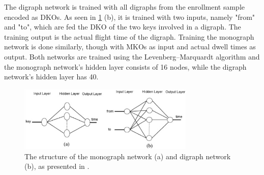 \documentclass[informationsecurity]{gucmasterproject}
\begin{document}
The digraph network is trained with all digraphs from the enrollment sample encoded as DKOs.
As seen in \cref{fig:ahmed-networks} (b), it is trained with two inputs, namely "from" and "to", which are fed the DKO of the two keys involved in a digraph. 
The training output is the actual flight time of the digraph.
Training the monograph network is done similarly, though with MKOs as input and actual dwell times as output.
Both networks are trained using the Levenberg–Marquardt algorithm and the monograph network's hidden layer consists of 16 nodes, while the digraph network's hidden layer has 40.

\begin{figure}[h]
    \centering
    \includegraphics[width=0.75\textwidth]{ahmed/networks}
    \caption{The structure of the monograph network (a) and digraph network (b), as presented in \cite{Ahmed}.}
    \label{fig:ahmed-networks}
\end{figure}
\end{document}

